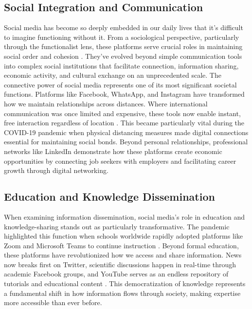 \documentclass{article}
\begin{document}
\subsection{Social Integration and Communication}
Social media has become so deeply embedded in our daily lives that it's difficult to imagine functioning without it. From a sociological perspective, particularly through the functionalist lens, these platforms serve crucial roles in maintaining social order and cohesion \citep{reitz2012}. They've evolved beyond simple communication tools into complex social institutions that facilitate connection, information sharing, economic activity, and cultural exchange on an unprecedented scale. The connective power of social media represents one of its most significant societal functions. Platforms like Facebook, WhatsApp, and Instagram have transformed how we maintain relationships across distances. Where international communication was once limited and expensive, these tools now enable instant, free interaction regardless of location \citep{reitz2012}. This became particularly vital during the COVID-19 pandemic when physical distancing measures made digital connections essential for maintaining social bonds. Beyond personal relationships, professional networks like LinkedIn demonstrate how these platforms create economic opportunities by connecting job seekers with employers and facilitating career growth through digital networking.

\subsection{Education and Knowledge Dissemination}
When examining information dissemination, social media's role in education and knowledge-sharing stands out as particularly transformative. The pandemic highlighted this function when schools worldwide rapidly adopted platforms like Zoom and Microsoft Teams to continue instruction \citep{onyema2020}. Beyond formal education, these platforms have revolutionized how we access and share information. News now breaks first on Twitter, scientific discussions happen in real-time through academic Facebook groups, and YouTube serves as an endless repository of tutorials and educational content \citep{hilton2016}. This democratization of knowledge represents a fundamental shift in how information flows through society, making expertise more accessible than ever before.
\end{document}
